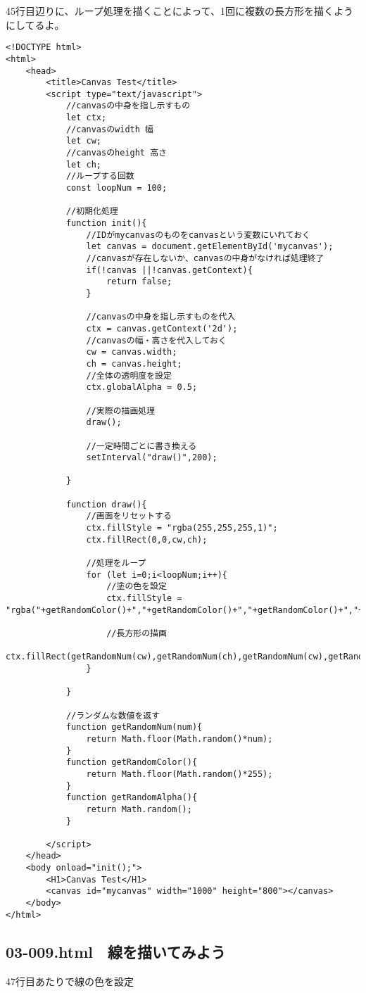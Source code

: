 \documentclass[mingoth,11pt,a4j,uplatex]{jsarticle}
\begin{document}
45行目辺りに、ループ処理を描くことによって、1回に複数の長方形を描くようにしてるよ。
\begin{lstlisting}[caption=　複数の長方形を描いてアニメーションする]
<!DOCTYPE html>
<html>
	<head>
		<title>Canvas Test</title>
		<script type="text/javascript">
			//canvasの中身を指し示すもの
			let ctx;
			//canvasのwidth 幅
			let cw;
			//canvasのheight 高さ
			let ch;
			//ループする回数
			const loopNum = 100;	
			
			//初期化処理
			function init(){
				//IDがmycanvasのものをcanvasという変数にいれておく
				let canvas = document.getElementById('mycanvas');
				//canvasが存在しないか、canvasの中身がなければ処理終了
				if(!canvas ||!canvas.getContext){
					return false;
				}
				
				//canvasの中身を指し示すものを代入
				ctx = canvas.getContext('2d');
				//canvasの幅・高さを代入しておく
				cw = canvas.width;
				ch = canvas.height;
				//全体の透明度を設定
				ctx.globalAlpha = 0.5;
				
				//実際の描画処理
				draw();
				
				//一定時間ごとに書き換える
				setInterval("draw()",200);

			}
			
			function draw(){
				//画面をリセットする
				ctx.fillStyle = "rgba(255,255,255,1)";
				ctx.fillRect(0,0,cw,ch);
				
				//処理をループ
				for (let i=0;i<loopNum;i++){
					//塗の色を設定
					ctx.fillStyle = "rgba("+getRandomColor()+","+getRandomColor()+","+getRandomColor()+","+getRandomAlpha()+")";
					
					//長方形の描画
					ctx.fillRect(getRandomNum(cw),getRandomNum(ch),getRandomNum(cw),getRandomNum(ch));
				}

			}
			
			//ランダムな数値を返す
			function getRandomNum(num){
				return Math.floor(Math.random()*num);
			}
			function getRandomColor(){
				return Math.floor(Math.random()*255);
			}
			function getRandomAlpha(){
				return Math.random();
			}

		</script>
	</head>
	<body onload="init();">
		<H1>Canvas Test</H1>
		<canvas id="mycanvas" width="1000" height="800"></canvas>
	</body>
</html>
\end{lstlisting}

\subsection{03-009.html　線を描いてみよう}
47行目あたりで線の色を設定
\end{document}
